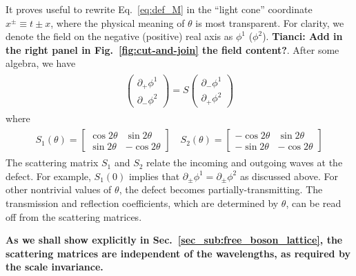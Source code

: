 It proves useful to rewrite Eq.~\eqref{eq:def_M} in the ``light cone'' coordinate $x^\pm\equiv t\pm x$, where the physical meaning of $\theta$ is most transparent. For clarity, we denote the field on the negative (positive) real axis as $\phi^1$ ($\phi^2$). {\bf\color{red}Tianci: Add in the right panel in Fig.~\ref{fig:cut-and-join} the field content?}. After some algebra, we have
\begin{eqnarray}\begin{aligned}
\label{eq:def_S}
\begin{pmatrix}
\partial_+\phi^1\\
\partial_-\phi^2
\end{pmatrix}
=S
\begin{pmatrix}
\partial_-\phi^1\\
\partial_+\phi^2
\end{pmatrix}
\end{aligned}\end{eqnarray}
where 
\begin{eqnarray}\begin{aligned}
\label{eq:S1_S2}
S_1(\theta)=\begin{bmatrix}
\cos 2\theta & \sin 2\theta \\
\sin 2\theta & -\cos 2\theta
\end{bmatrix}\quad
S_2(\theta)=\begin{bmatrix}
-\cos 2\theta & \sin 2\theta \\
-\sin 2\theta & -\cos 2\theta
\end{bmatrix}
\end{aligned}\end{eqnarray}
The scattering matrix $S_1$ and $S_2$ relate the incoming and outgoing waves at the defect. For example, $S_1(0)$ implies that $\partial_\pm\phi^{1}=\partial_\pm\phi^{2}$ as discussed above. For other nontrivial values of $\theta$, the defect becomes partially-transmitting. The transmission and reflection coefficients, which are determined by $\theta$, can be read off from the scattering matrices.

{\bf\color{red}As we shall show explicitly in Sec.~\ref{sec_sub:free_boson_lattice}, the scattering matrices are independent of the wavelengths, as required by the scale invariance.}

